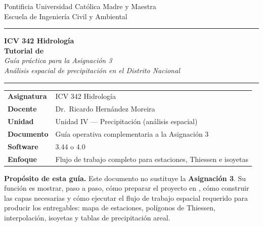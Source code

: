 \documentclass[11pt]{article}
\begin{document}
\begin{center}
  {\small\color{midgrey} Pontificia Universidad Católica Madre y Maestra\\
  Escuela de Ingeniería Civil y Ambiental}

  \vspace{1.4cm}
  {\color{olive}\rule{\linewidth}{2pt}}
  \vspace{0.3cm}

  {\Large\bfseries\color{darkblue} ICV 342 Hidrología}\\[0.4em]
  {\LARGE\bfseries\color{darkblue} Tutorial de \qgis{}}\\[0.3em]
  {\large\itshape Guía práctica para la Asignación 3\\
  Análisis espacial de precipitación en el Distrito Nacional}

  \vspace{0.3cm}
  {\color{olive}\rule{\linewidth}{2pt}}
  \vspace{1.0cm}
\end{center}

\begin{center}
\begin{tabular}{ll}
\toprule
\textbf{Asignatura}   & ICV 342 Hidrología \\
\textbf{Docente}      & Dr.\ Ricardo Hernández Moreira \\
\textbf{Unidad}       & Unidad IV — Precipitación (análisis espacial) \\
\textbf{Documento}    & Guía operativa complementaria a la Asignación 3 \\
\textbf{Software}     & \qgis{} 3.44 o 4.0 \\
\textbf{Enfoque}      & Flujo de trabajo completo para estaciones, Thiessen e isoyetas \\
\bottomrule
\end{tabular}
\end{center}

\begin{infobox}
\textbf{Propósito de esta guía.}
Este documento no sustituye la \textbf{Asignación 3}. Su función es mostrar,
paso a paso, cómo preparar el proyecto en \qgis{}, cómo construir las capas
necesarias y cómo ejecutar el flujo de trabajo espacial requerido para producir
los entregables: mapa de estaciones, polígonos de Thiessen, interpolación,
isoyetas y tablas de precipitación areal.
\end{infobox}
\end{document}
